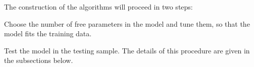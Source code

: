 The construction of the algorithms will proceed in two steps:
\bi
\item
Choose the number of free parameters in the model and tune them, so that the model fits the training data.
\item
Test the model in the testing sample.
\ei
The details of this procedure are given in the subsections below.

